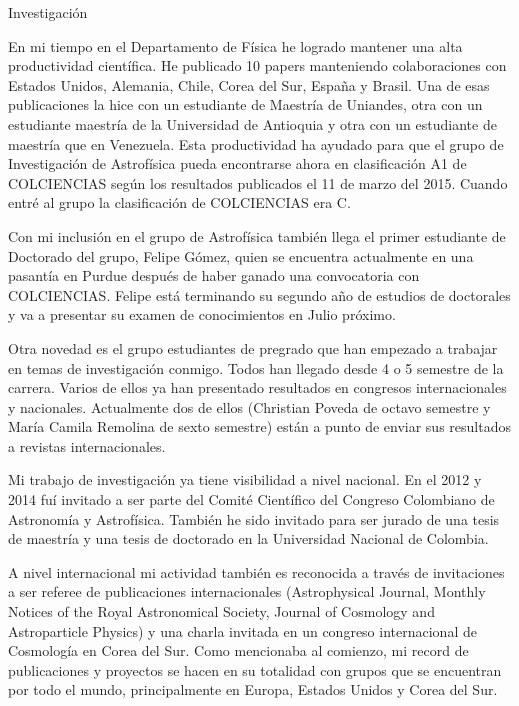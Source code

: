 Investigación

En mi tiempo en el Departamento de Física he logrado mantener una alta
productividad científica. He publicado 10 papers manteniendo
colaboraciones con Estados Unidos, Alemania, Chile, Corea del Sur,
España y Brasil. Una de esas publicaciones la hice con un estudiante
de Maestría de Uniandes, otra con un estudiante maestría de la
Universidad de Antioquia y otra con un estudiante de maestría que en
Venezuela. Esta productividad ha ayudado para que el grupo de
Investigación de Astrofísica pueda encontrarse ahora en clasificación
A1 de COLCIENCIAS según los resultados publicados el 11 de marzo del
2015. Cuando entré al grupo la clasificación de COLCIENCIAS era C.  

Con mi inclusión en el grupo de Astrofísica también llega el primer
estudiante de Doctorado del grupo, Felipe Gómez, quien se encuentra
actualmente en una pasantía en Purdue después de haber ganado una
convocatoria con COLCIENCIAS. Felipe está terminando su segundo año de
estudios de doctorales y va a presentar su examen de conocimientos en
Julio próximo. 

Otra novedad es el grupo estudiantes de pregrado que han empezado a
trabajar en temas de investigación conmigo. Todos han llegado desde 4
o 5 semestre de la carrera. Varios de ellos ya han presentado
resultados en congresos internacionales y nacionales. Actualmente dos
de ellos (Christian Poveda de octavo semestre y María Camila Remolina
de sexto semestre) están a punto de enviar sus resultados a revistas
internacionales.  

Mi trabajo de investigación ya tiene visibilidad a nivel nacional. En
el 2012 y 2014 fuí invitado a ser parte del Comité Científico del
Congreso Colombiano de Astronomía y Astrofísica. También he sido
invitado para ser jurado de una tesis de maestría y una tesis de
doctorado en la Universidad Nacional de Colombia.  

A nivel internacional mi actividad también es reconocida a través de
invitaciones a ser referee de publicaciones internacionales
(Astrophysical Journal, Monthly Notices of the Royal Astronomical
Society, Journal of Cosmology and Astroparticle Physics) y una charla
invitada en un congreso internacional de Cosmología en Corea del
Sur. Como mencionaba al comienzo, mi record de publicaciones y
proyectos se hacen en su totalidad con grupos que se encuentran por
todo el mundo, principalmente en Europa, Estados Unidos y Corea del
Sur. 

